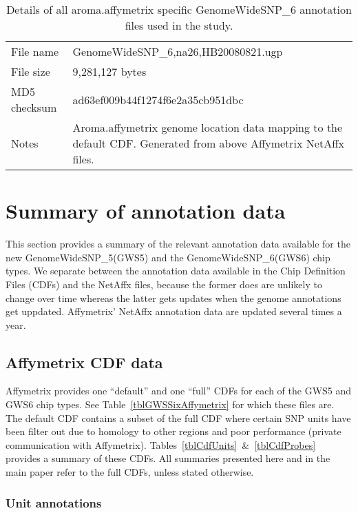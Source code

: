 \documentclass[10pt,a4paper]{article}
\newcommand{\GWSFivef}{GenomeWideSNP\_5\xspace}
\newcommand{\GWSSixf}{GenomeWideSNP\_6\xspace}
\begin{document}
\begin{table}[htp]
\begin{center}
\begin{tabular}{lp{}}
\hline
File name    & GenomeWideSNP\_6,na26,HB20080821.ugp \\
File size    & 9,281,127 bytes \\
MD5 checksum & ad63ef009b44f1274f6e2a35cb951dbc \\
Notes        & Aroma.affymetrix genome location data mapping to the default CDF.  Generated from above Affymetrix NetAffx files. \\
\hline
\end{tabular}
\end{center}
\caption{Details of all aroma.affymetrix specific GenomeWideSNP\_6 annotation files used in the study.}
\label{tblGWSSixAromaAffymetrix}
\end{table}



\clearpage
\section{Summary of annotation data}

This section provides a summary of the relevant annotation data available for the new \GWSFivef (GWS5) and the \GWSSixf (GWS6) chip types.  We separate between the annotation data available in the Chip Definition Files (CDFs) and the NetAffx files, because the former does are unlikely to change over time whereas the latter gets updates when the genome annotations get uppdated.  Affymetrix' NetAffx annotation data are updated several times a year.

\subsection{Affymetrix CDF data}

Affymetrix provides one ``default'' and one ``full'' CDFs for each of the GWS5 and GWS6 chip types.  See Table~\ref{tblGWSSixAffymetrix} for which these files are.
The default CDF contains a subset of the full CDF where certain SNP units have been filter out due to homology to other regions and poor performance (private communication with Affymetrix).
Tables~\ref{tblCdfUnits}~\&~\ref{tblCdfProbes} provides a summary of these CDFs.
All summaries presented here and in the main paper refer to the full CDFs, unless stated otherwise.

\subsubsection{Unit annotations}
\end{document}
